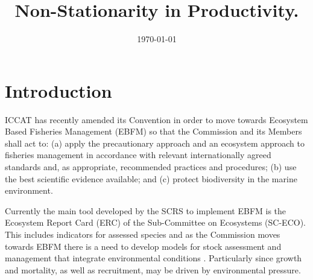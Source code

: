 \documentclass[12pt,doublespacing,a4paper]{ouparticle}
\begin{document}
\title{Non-Stationarity in Productivity.}

\author{%
\address{Centre for Environmental Policy, Imperial College London, London SW7 1NE}
\and
\name{}
\address{}
}


\date{\today}

 
\maketitle

\newpage


\linenumbers
\linespread{2}

\section{Introduction}

ICCAT has recently amended its Convention in order to move towards Ecosystem Based Fisheries Management (EBFM) so that the Commission and its Members shall act to: (a) apply the precautionary approach and an ecosystem approach to fisheries management in accordance with relevant internationally agreed standards and, as appropriate, recommended practices and procedures; (b) use the best scientific evidence available; and (c) protect biodiversity in the marine environment.

Currently the main tool developed by the SCRS to implement EBFM is the Ecosystem Report Card (ERC) of the Sub-Committee on Ecosystems (SC-ECO). This includes indicators for assessed species and as the Commission moves towards EBFM there is a need to develop models for stock assessment and management that integrate environmental conditions \citep{travis2014integrating}.  Particularly since growth and mortality, as well as recruitment, may be driven by environmental pressure.
\end{document}
